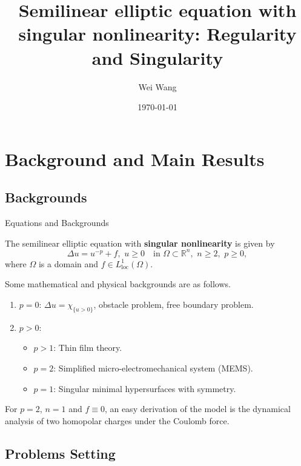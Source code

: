 \documentclass[11pt]{beamer}
\title{Semilinear elliptic equation with singular nonlinearity: Regularity and Singularity}
\author{Wei Wang}
\institute[Peking University] %
{
  Peking University,
  School of Mathematical Sciences\\
}
\date{\today}
\newcommand{\om}{\Omega}
\newcommand{\be}{\begin{equation}}
\newcommand{\ee}{\end{equation}}
\newcommand{\R}{\mathbb{R}}
\DeclareMathOperator{\loc}{loc}
\theoremstyle{plain}
\theoremstyle{definition}
\begin{document}
\small
\frame{\titlepage}


\section{Background and Main Results}

\subsection{Backgrounds}

\begin{frame}{Equations and Backgrounds}

The semilinear elliptic equation with \textbf{singular nonlinearity} is given by
\be
\Delta u=u^{-p}+f,\,\,u\geq 0\quad\text{in }\om\subset\R^n,\,\,n\geq 2,\,\,p\geq 0,\tag{SN}\label{MEMSeq}
\ee
where $ \om $ is a domain and $ f\in L_{\loc}^1(\om) $. \pause

\vspace{1em}

Some mathematical and physical backgrounds are as follows. 

\begin{enumerate}
\item $ p=0 $: $ \Delta u=\chi_{\{u>0\}} $, obstacle problem, free boundary problem.
\item $ p>0 $:
\begin{itemize}
\item $ p>1 $: Thin film theory.
\item $ p=2 $: Simplified micro-electromechanical system (MEMS).
\item $ p=1 $: Singular minimal hypersurfaces with symmetry.
\end{itemize}
\end{enumerate}\pause

\vspace{1em}

For $ p=2 $, $ n=1 $ and $ f\equiv 0 $, an easy derivation of the model is the dynamical analysis of two homopolar charges under the Coulomb force.

\end{frame}

\subsection{Problems Setting}
\end{document}
